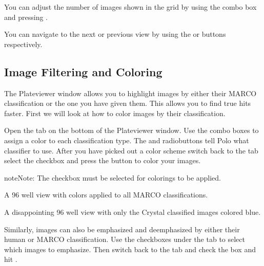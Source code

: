 \documentclass[letterpaper,10pt,english]{sphinxmanual}
\begin{document}
You can adjust the number of images shown in the grid by using the
 combo box and pressing .
\begin{quote}

\noindent{}
\end{quote}

You can navigate to the next or previous view by using the  or
 buttons respectively.


\subsection{Image Filtering and Coloring}
\label{\detokenize{user_guide:image-filtering-and-coloring}}
The Plateviewer window allows you to highlight images by either their MARCO
classification or the one you have given them. This allows you to find true
hits faster. First we will look at how to color images by their classification.

Open the  tab on the bottom of the Plateviewer window.
Use the combo boxes to assign a color to each classification type. The
 and  radiobuttons tell Polo what classifier to use.
After you have picked out a color scheme switch back to the  tab
select the  checkbox and
press the  button to color your images.

\begin{sphinxadmonition}{note}{Note:}
The  checkbox must be selected for colorings to be applied.
\end{sphinxadmonition}

A 96 well view with colors applied to all MARCO classifications.
\begin{quote}

\noindent{}
\end{quote}

A disappointing 96 well view with only the Crystal classified images colored blue.
\begin{quote}

\noindent{}
\end{quote}

Similarly, images can also be emphasized and deemphasized by either their
human or MARCO classification. Use the checkboxes under the 
tab to select which images to emphasize. Then switch back to the  tab
and check the  box and hit .
\end{document}

